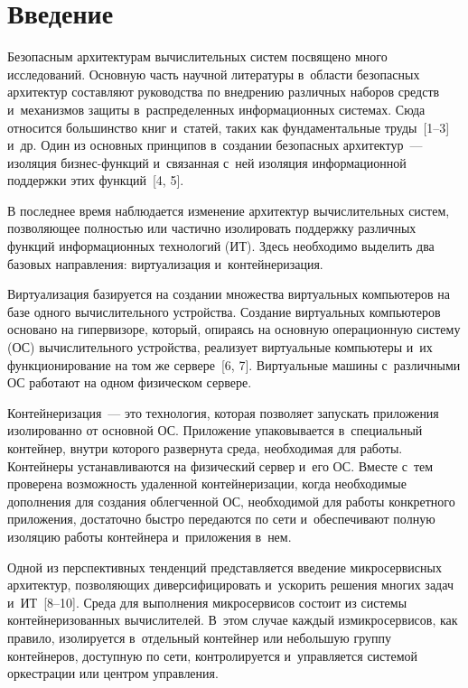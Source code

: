 \begin{multicols}{2}

\label{st\stat}
   
  \section{Введение }
  
  \vspace*{-2pt}
  
  Безопасным архитектурам вычислительных сис\-тем посвящено много 
исследований. Основную часть научной литературы в~об\-ласти безопасных 
архитектур составляют руководства по внедрению различных наборов средств 
и~механизмов защиты в~распределенных информационных системах. Сюда 
относится большинство книг и~статей, таких как фундаментальные труды~[1--3] 
и~др. Один из основных принципов в~создании безопасных архитектур~--- 
изоляция бизнес-функций и~связанная с~ней изоляция информационной 
поддержки этих функций~[4, 5].
  
  В последнее время наблюдается изменение архитектур вычислительных систем, 
позволяющее полностью или частично изолировать поддержку различных 
функций информационных технологий (ИТ). Здесь необходимо выделить два 
базовых направления: виртуализация и~контейнеризация.
  
  Виртуализация базируется на создании множества виртуальных компьютеров на 
базе одного вычислительного устройства. Создание виртуальных компьютеров 
основано на гипервизоре, который, опираясь на основную операционную систему 
(ОС) вычислительного устройства, реализует виртуальные компьютеры и~их 
функционирование на том же сервере~[6, 7]. Виртуальные машины с~различными 
ОС работают на одном физическом сервере.

  Контейнеризация~--- это технология, которая позволяет запускать приложения 
изолированно от основной ОС. Приложение упаковывается в~специальный 
контейнер, внутри которого развернута среда, необходимая для работы. 
Контейнеры устанавливаются на физический сервер и~его ОС. Вместе с~тем 
проверена возможность удаленной контейнеризации, когда необходимые 
дополнения для создания облегченной ОС, необходимой для работы конкретного 
приложения, достаточно быст\-ро передаются по сети и~обеспечивают полную 
изоляцию работы контейнера и~приложения в~нем.
  
  Одной из перспективных тенденций пред\-став\-ля\-ет\-ся введение микросервисных 
архитектур, поз\-во\-ля\-ющих диверсифицировать и~ускорить решения многих задач 
и~ИТ~[8--10]. Среда для выполнения 
микросервисов состоит из сис\-те\-мы контейнеризованных вычислителей. В~этом 
случае каждый из\linebreak микросервисов, как правило, изолируется в~отдельный 
контейнер или небольшую группу контейнеров, до\-ступ\-ную по сети, 
контролируется и~управ\-ля\-ет\-ся сис\-те\-мой оркестрации или центром \mbox{управления}.
  

\end{multicols}
